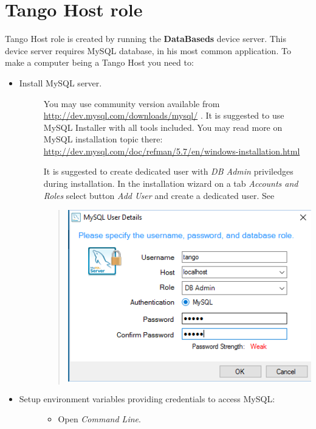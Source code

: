 \documentclass[letterpaper,10pt,english]{sphinxmanual}
\begin{document}
\section{Tango Host role}
\label{tango-on-windows:tango-host-role}
Tango Host role is created by running the \textbf{DataBaseds} device server. This device server requires MySQL
database, in his most common application. To make a computer being a Tango Host you need to:
\begin{itemize}
\item {} \begin{description}
\item[{Install MySQL server.}] \leavevmode
You may use community version available from \href{http://dev.mysql.com/downloads/mysql/}{http://dev.mysql.com/downloads/mysql/} . It is suggested to use MySQL
Installer with all tools included. You may read more on MySQL installation topic there:
\href{http://dev.mysql.com/doc/refman/5.7/en/windows-installation.html}{http://dev.mysql.com/doc/refman/5.7/en/windows-installation.html}

It is suggested to create dedicated  user with \emph{DB Admin} priviledges during installation.
In the installation wizard on a tab \emph{Accounts and Roles} select button \emph{Add User}
and create a dedicated user. See
\begin{quote}

\includegraphics{mysql-user-02.png}
\end{quote}

\end{description}

\item {} \begin{description}
\item[{Setup environment variables providing credentials to access MySQL:}] \leavevmode\begin{itemize}
\item {} 
Open \emph{Command Line}.


\end{itemize}
\end{description}
\end{itemize}
\end{document}
